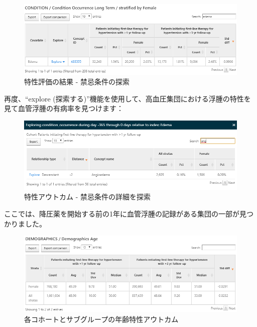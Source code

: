 \documentclass[
  11pt]{book}
\theoremstyle{definition}
\theoremstyle{definition}
\theoremstyle{definition}
\theoremstyle{definition}
\theoremstyle{remark}
\begin{document}
\begin{figure}

{\centering \includegraphics[width=1\linewidth]{images/Characterization/atlasCharacterizationResultsContra} 

}

\caption{特性評価の結果 - 禁忌条件の探索}\label{fig:atlasCharacterizationResultsContra}
\end{figure}

再度、``explore (探索する)''機能を使用して、高血圧集団における浮腫の特性を見て血管浮腫の有病率を見つけます：

\begin{figure}

{\centering \includegraphics[width=1\linewidth]{images/Characterization/atlasCharacterizationResultsContraExplore} 

}

\caption{特性アウトカム - 禁忌条件の詳細を探索}\label{fig:atlasCharacterizationResultsContraExplore}
\end{figure}

ここでは、降圧薬を開始する前の1年に血管浮腫の記録がある集団の一部が見つかりました。

\begin{figure}

{\centering \includegraphics[width=1\linewidth]{images/Characterization/atlasCharacterizationResultsContinuous} 

}

\caption{各コホートとサブグループの年齢特性アウトカム}\label{fig:atlasCharacterizationResultsContinuous}
\end{figure}
\end{document}
